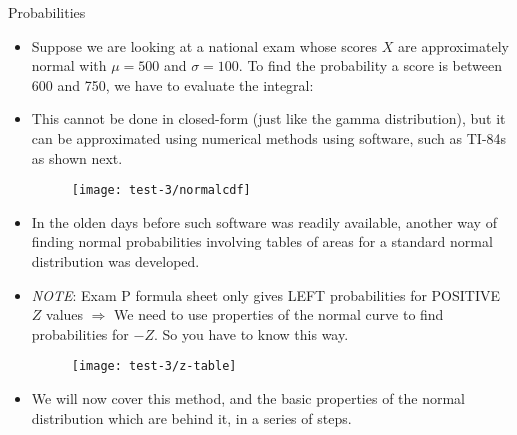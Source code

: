 \documentclass{article}
\begin{document}
Probabilities\bigskip
\begin{itemize}
    \item Suppose we are looking at a national exam whose scores $X$ are approximately normal with $\mu = 500$ and $\sigma = 100$. To find the probability a score is between 600 and 750, we have to evaluate the integral:\vspace{40pt}
    \item This cannot be done in closed-form (just like the gamma distribution), but it can be approximated using numerical methods using software, such as TI-84s as shown next.
    
    \newpage 
    
    \begin{figure}[H]
        \center\texttt{[image: test-3/normalcdf]}
    \end{figure}
    \item In the olden days before such software was readily available, another way of finding normal probabilities involving tables of areas for a standard normal distribution was developed.
    \item[] \textit{NOTE}: Exam P formula sheet only gives LEFT probabilities for POSITIVE $Z$ values  $\Longrightarrow$ We need to use properties of the normal curve to find probabilities for $-Z$. So you have to know this way.
    \begin{figure}[H]
        \center\texttt{[image: test-3/z-table]}
    \end{figure}\vspace{100pt}
    \item We will now cover this method, and the basic properties of the normal distribution which are behind it, in a series of steps.
    
    \newpage
    

\end{itemize}
\end{document}
